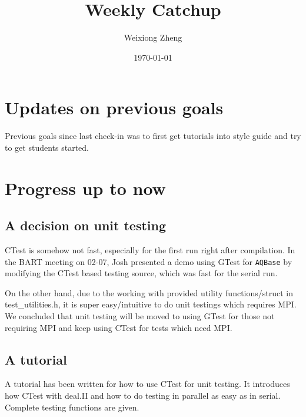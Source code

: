\documentclass{article}
\title{Weekly Catchup} %
\author{Weixiong Zheng} %
\date{\today} %
\begin{document}
\maketitle %

\section{Updates on previous goals}
Previous goals since last check-in was to first get tutorials into style guide and try to get students started.

\section{Progress up to now}
\subsection{A decision on unit testing}
CTest is somehow not fast, especially for the first run right after compilation. In the BART meeting on 02-07, Josh presented a demo using GTest for {\tt AQBase} by modifying the CTest based testing source, which was fast for the serial run.

On the other hand, due to the working with provided utility functions/struct in test\_utilities.h, it is super easy/intuitive to do unit testings which requires MPI. We concluded that unit testing will be moved to using GTest for those not requiring MPI and keep using CTest for tests which need MPI.

\subsection{A tutorial}
A tutorial has been written for how to use CTest for unit testing. It introduces how CTest with deal.II and how to do testing in parallel as easy as in serial. Complete testing functions are given.
\end{document}
